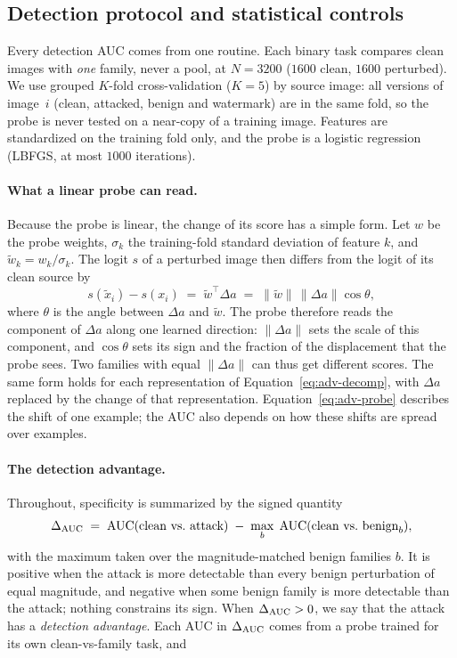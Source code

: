 \documentclass[../ppgc-tese.tex]{subfiles}
\begin{document}
\subsection{Detection protocol and statistical controls}
\label{sec:adv-protocol}
Every detection AUC comes from one routine. Each binary task compares clean
images with \emph{one} family, never a pool, at $N{=}3200$ ($1600$ clean,
$1600$ perturbed). We use grouped $K$-fold cross-validation ($K{=}5$) by
source image: all versions of image~$i$ (clean, attacked, benign and
watermark) are in the same fold, so the probe is never tested on a near-copy
of a training image. Features are standardized on the training fold only, and
the probe is a logistic regression (LBFGS, at most $1000$ iterations).

\paragraph*{What a linear probe can read.}
Because the probe is linear, the change of its score has a simple form. Let
$w$ be the probe weights, $\sigma_k$ the training-fold standard deviation of
feature $k$, and $\tilde{w}_k = w_k/\sigma_k$. The logit $s$ of a perturbed
image then differs from the logit of its clean source by
\begin{equation}
  s(\tilde{x}_i) - s(x_i) \;=\; \tilde{w}^{\top}\Delta a
  \;=\; \lVert\tilde{w}\rVert\,\lVert\Delta a\rVert\cos\theta,
  \label{eq:adv-probe}
\end{equation}
where $\theta$ is the angle between $\Delta a$ and $\tilde{w}$. The probe
therefore reads the component of $\Delta a$ along one learned direction:
$\lVert\Delta a\rVert$ sets the scale of this component, and $\cos\theta$ sets
its sign and the fraction of the displacement that the probe sees. Two
families with equal $\lVert\Delta a\rVert$ can thus get different scores. The
same form holds for each representation of Equation~\eqref{eq:adv-decomp},
with $\Delta a$ replaced by the change of that representation.
Equation~\eqref{eq:adv-probe} describes the shift of one example; the AUC also
depends on how these shifts are spread over examples.

\paragraph*{The detection advantage.}
Throughout, specificity is summarized by the signed quantity
\begin{equation}
  \dauc \;=\; \mathrm{AUC}(\text{clean vs.\ attack})
  \;-\; \max_{b}\;\mathrm{AUC}(\text{clean vs.\ benign}_{b}),
  \label{eq:adv-dauc}
\end{equation}
with the maximum taken over the magnitude-matched benign families $b$. It is
positive when the attack is more detectable than every benign perturbation of
equal magnitude, and negative when some benign family is more detectable than
the attack; nothing constrains its sign. When $\Delta_{\mathrm{AUC}}>0$, we say that the
attack has a \emph{detection advantage}. Each AUC in $\Delta_{\mathrm{AUC}}$ comes from a
probe trained for its own clean-vs-family task, and
\end{document}
